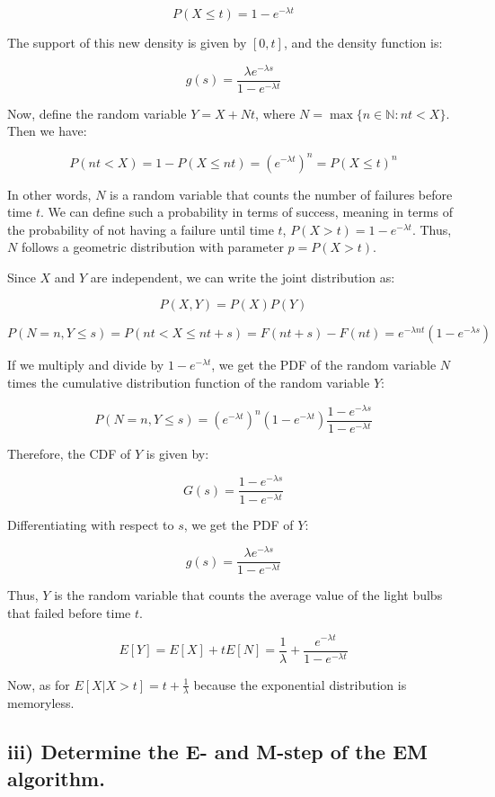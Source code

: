 \documentclass[
]{article}
\begin{document}
\[
P(X \leq t) = 1 - e^{-\lambda t}
\]

The support of this new density is given by \([0, t]\), and the density
function is:

\[
g(s) = \frac{\lambda e^{-\lambda s}}{1 - e^{-\lambda t}}
\]

Now, define the random variable \(Y = X + Nt\), where
\(N = \max\{n \in \mathbb{N} : nt < X\}\). Then we have:

\[
P(nt < X) = 1 - P(X \leq nt) = (e^{-\lambda t})^n = P(X \leq t)^n
\]

In other words, \(N\) is a random variable that counts the number of
failures before time \(t\). We can define such a probability in terms of
success, meaning in terms of the probability of not having a failure
until time \(t\), \(P(X > t) = 1 - e^{-\lambda t}\). Thus, \(N\) follows
a geometric distribution with parameter \(p = P(X > t)\).

Since \(X\) and \(Y\) are independent, we can write the joint
distribution as:

\[
P(X, Y) = P(X)P(Y)
\]

\[
P(N = n, Y \leq s) = P(nt < X \leq nt + s) = F(nt + s) - F(nt) = e^{-\lambda nt}(1 - e^{-\lambda s})
\]

If we multiply and divide by \(1 - e^{-\lambda t}\), we get the PDF of
the random variable \(N\) times the cumulative distribution function of
the random variable \(Y\):

\[
P(N = n, Y \leq s) = (e^{-\lambda t})^n (1 - e^{-\lambda t}) \frac{1 - e^{-\lambda s}}{1 - e^{-\lambda t}}
\]

Therefore, the CDF of \(Y\) is given by:

\[
G(s) = \frac{1 - e^{-\lambda s}}{1 - e^{-\lambda t}}
\]

Differentiating with respect to \(s\), we get the PDF of \(Y\):

\[
g(s) = \frac{\lambda e^{-\lambda s}}{1 - e^{-\lambda t}}
\]

Thus, \(Y\) is the random variable that counts the average value of the
light bulbs that failed before time \(t\).

\[
E[Y] = E[X] + tE[N] = \frac{1}{\lambda} + \frac{e^{-\lambda t}}{1 - e^{-\lambda t}}
\]

Now, as for \(E[X| X > t] = t + \frac{1}{\lambda}\) because the
exponential distribution is memoryless.

\subsection{iii) Determine the E- and M-step of the EM
algorithm.}\label{iii-determine-the-e--and-m-step-of-the-em-algorithm.}
\end{document}
